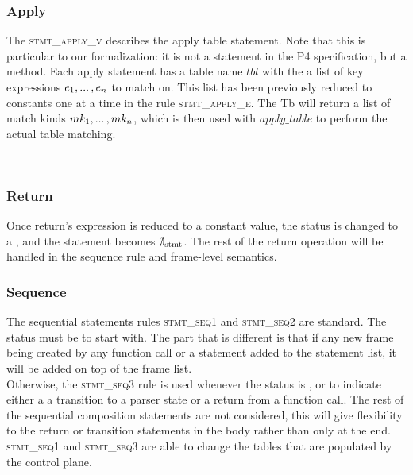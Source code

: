 \documentclass[UTF8]{article}
\begin{document}
\subsubsection*{Apply} 
The \textsc{stmt\_apply\_v} describes the apply table statement. Note that this is particular to our formalization: it is not a statement in the P4 specification, but a method. Each apply statement has a table name $tbl$ with the a list of key expressions $e_1 , ... \, , e_n$ to match on. This list has been previously reduced to constants one at a time in the rule \textsc{stmt\_apply\_e}. The Tb will return a list of match kinds $mk_1 , ... \, , mk_n$, which is then used with $\mathit{apply\_table}$ to perform the actual table matching. %


\begin{figure}[ht!]
    \ottusedrule{\ottdrulestmtXXapplyXXtableXXe{}} \\
    \ottusedrule{\ottdrulestmtXXapplyXXtableXXv{}} 
\end{figure}

\subsubsection*{Return}
Once return's expression is reduced to a constant value, the status is changed to a \returnst{} \cval, and the statement becomes $\emptyset_{ \mathrm{stmt} }{}$. The rest of the return operation will be handled in the sequence rule and frame-level semantics.

\begin{figure}[ht!]
    \ottusedrule{\ottdrulestmtXXretXXv{}} 
\end{figure}

\subsubsection*{Sequence}
The sequential statements rules \textsc{stmt\_seq1} and \textsc{stmt\_seq2} are standard. The status \status{} must be \running{} to start with. The part that is different is that if any new frame being created by any function call or a statement added to the statement list, it will be added on top of the frame list. \\

Otherwise, the \textsc{stmt\_seq3}  rule is used whenever the status is \returnst{}, or \trans{} to indicate either a a transition to a parser state or a return from a function call. The rest of the sequential composition statements are not considered, this will give flexibility to the return or transition statements in the body rather than only at the end.
\textsc{stmt\_seq1} and \textsc{stmt\_seq3} are able to change the tables that are populated by the control plane.
\end{document}
